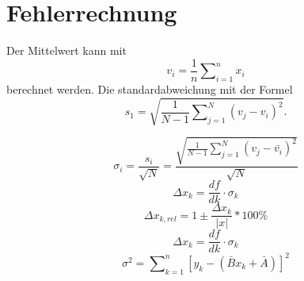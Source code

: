 \section{Fehlerrechnung}
\label{sec:Fehlerrechnung}
Der Mittelwert kann mit
\begin{equation}
  v_i= \frac{1}{n}\sum\nolimits_{i=1}^n x_i
  \label{eqn:gl11}
\end{equation}
berechnet werden. Die standardabweichung mit der Formel
\begin{equation}
  \label{eqn:gl12}
  s_1= \sqrt{\frac{1}{N-1}\sum\nolimits_{j=1}^N(v_j-v_i)^2} .
\end{equation}

\begin{equation}
  \label{eqn:gl13}
  \sigma_i=\frac{s_i}{\sqrt{N}}=
  \frac{\sqrt{\frac{1}{N-1}\sum\nolimits_{j=1}^N(v_j-\bar{v_i})^2}}{\sqrt{N}}
\end{equation}
\begin{equation}
  \Delta x_k = \frac{df}{dk} \cdot \sigma_k
\end{equation}
\begin{equation}
  \Delta x_{k,rel}=1 \pm \frac{\Delta x_k}{|x|}*100 \%
\end{equation}
\begin{equation}
  \Delta x_k = \frac{df}{dk} \cdot \sigma_k
\end{equation}
\begin{equation}
  \sigma^2=\sum\nolimits_{k=1}^n [y_k-(\bar{B}x_k+\bar{A})]^2
\end{equation}

